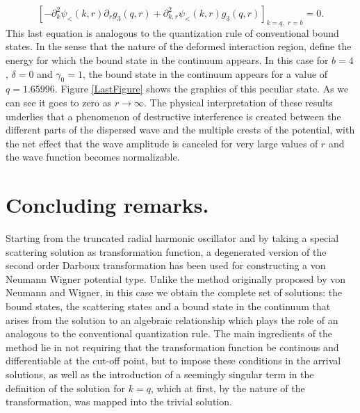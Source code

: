 \documentclass[a4paper]{jpconf}
\begin{document}
\begin{equation}
\left[-\partial^2_k\psi_{<}(k,r)\partial_{r}g_3(q,r) + \partial^2_{k,r}\psi_{<}(k,r)g_3(q,r)\right]_{k=q,\,\,r=b}=0.
\end{equation}
This last equation is analogous to the quantization rule of conventional bound states. In the sense that the nature of the deformed interaction region, define the energy for which the bound state in the continuum appears. In this case for $b=4$, $\delta=0$ and $\gamma_0=1$, the bound state in the continuum appears for a value of $q=1.65996$. Figure \ref{LastFigure} shows the graphics of this peculiar state. As we can see it goes to zero as $r\rightarrow\infty$. The physical interpretation of these results underlies that a phenomenon of destructive interference is created between the different parts of the dispersed wave and the multiple crests of the potential, with the net effect that the wave amplitude is canceled  for very large values of $r$ and the wave function becomes normalizable.

\section{Concluding remarks.}

Starting from the truncated radial harmonic oscillator and by taking a special scattering solution as transformation function, a degenerated version of the second order Darboux transformation has been used for constructing a von Neumann Wigner potential type. Unlike the method originally proposed by von Neumann and Wigner, in this case we obtain the complete set of solutions: the bound states, the scattering states and a bound state in the continuum that arises from the solution to an algebraic relationship which plays the role of an analogous to the conventional quantization rule. The main ingredients of the method lie in not requiring that the transformation function be continous and differentiable at the cut-off point, but to impose these conditions  in the arrival solutions, as well as the introduction of a seemingly singular term in the definition of the solution for $ k = q $, which at first, by the nature of the transformation, was mapped into the trivial solution.\\[.2cm]
\end{document}

